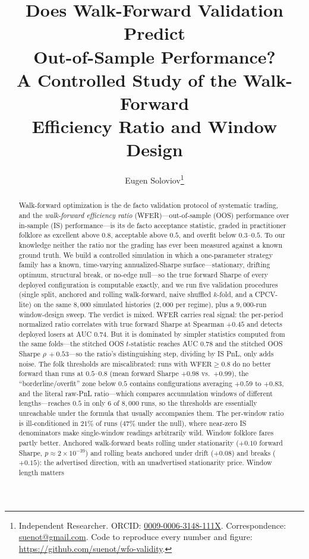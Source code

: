 \documentclass[11pt]{article}
\title{\bfseries Does Walk-Forward Validation Predict\\ Out-of-Sample Performance?\\
A Controlled Study of the Walk-Forward\\ Efficiency Ratio and Window Design}
\author{Eugen Soloviov\thanks{Independent Researcher. ORCID:
\href{https://orcid.org/0009-0006-3148-111X}{0009-0006-3148-111X}.
Correspondence: \href{mailto:suenot@gmail.com}{suenot@gmail.com}.
Code to reproduce every number and figure:
\url{https://github.com/suenot/wfo-validity}.}}
\date{}
\newcommand{\wfer}{\mathrm{WFER}}
\begin{document}
\maketitle

\begin{abstract}
Walk-forward optimization is the de facto validation protocol of systematic
trading, and the \emph{walk-forward efficiency ratio} (WFER)---out-of-sample
(OOS) performance over in-sample (IS) performance---is its de facto acceptance
statistic, graded in practitioner folklore as excellent above $0.8$, acceptable
above $0.5$, and overfit below $0.3$--$0.5$. To our knowledge neither the ratio
nor the grading has ever been measured against a known ground truth. We build a
controlled simulation in which a one-parameter strategy family has a known,
time-varying annualized-Sharpe surface---stationary, drifting optimum,
structural break, or no-edge null---so the true forward Sharpe of every
deployed configuration is computable exactly, and we run five validation
procedures (single split, anchored and rolling walk-forward, naive shuffled
$k$-fold, and a CPCV-lite) on the same $8{,}000$ simulated histories
($2{,}000$ per regime), plus a $9{,}000$-run window-design sweep. The verdict
is mixed. WFER carries real signal: the per-period normalized ratio correlates
with true forward Sharpe at Spearman $+0.45$ and detects deployed losers at
AUC $0.74$. But it is dominated by simpler statistics computed from the same
folds---the stitched OOS $t$-statistic reaches AUC $0.78$ and the stitched OOS
Sharpe $\rho\,{+}0.53$---so the ratio's distinguishing step, dividing by IS
PnL, only adds noise. The folk thresholds are miscalibrated: runs with
$\wfer\ge 0.8$ do no better forward than runs at $0.5$--$0.8$ (mean forward
Sharpe $+0.98$ vs.\ $+0.99$), the ``borderline/overfit'' zone below $0.5$
contains configurations averaging $+0.59$ to $+0.83$, and the literal raw-PnL
ratio---which compares accumulation windows of different lengths---reaches
$0.5$ in only $6$ of $8{,}000$ runs, so the thresholds are essentially
unreachable under the formula that usually accompanies them. The per-window
ratio is ill-conditioned in $21\%$ of runs ($47\%$ under the null), where
near-zero IS denominators make single-window readings arbitrarily wild.
Window folklore fares partly better. Anchored walk-forward beats rolling under
stationarity ($+0.10$ forward Sharpe, $p\approx 2\times10^{-39}$) and rolling
beats anchored under drift ($+0.08$) and breaks ($+0.15$): the advertised
direction, with an unadvertised stationarity price. Window length matters

\end{abstract}
\end{document}
